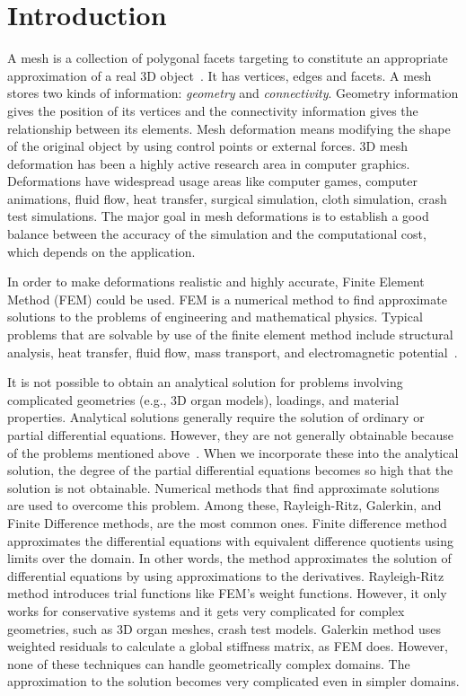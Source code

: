 \chapter{Introduction}
\label{chapter1}

A mesh is a collection of polygonal facets targeting to constitute an appropriate approximation of a real 3D object~\cite{Wang07}. It has vertices, edges and facets. A mesh stores two kinds of information: \textit{geometry} and \textit{connectivity}. Geometry information gives the position of its vertices and the connectivity information gives the relationship between its elements. Mesh deformation means modifying the shape of the original object by using control points or external forces. 3D mesh deformation has been a highly active research area in computer graphics. Deformations have widespread usage areas like computer games, computer animations, fluid flow, heat transfer, surgical simulation, cloth simulation, crash test simulations. The major goal in mesh deformations is to establish a good balance between the accuracy of the simulation and the computational cost, which depends on the application.

In order to make deformations realistic and highly accurate, Finite Element Method (FEM) could be used. FEM is a numerical method to find approximate solutions to the problems of engineering and mathematical physics. Typical problems that are solvable by use of the finite element method include structural analysis, heat transfer, fluid flow, mass transport, and electromagnetic potential~\cite{Logan07}.

It is not possible to obtain an analytical solution for problems involving complicated geometries (e.g., 3D organ models), loadings, and material properties. Analytical solutions generally require the solution of ordinary or partial differential equations. However, they are not generally obtainable because of the problems mentioned above~\cite{Logan07}. When we incorporate these into the analytical solution, the degree of the partial differential equations becomes so high that the solution is not obtainable. Numerical methods that find approximate solutions are used to overcome this problem. Among these, Rayleigh-Ritz, Galerkin, and Finite Difference methods, are the most common ones. Finite difference method approximates the differential equations with equivalent difference quotients using limits over the domain. In other words, the method approximates the solution of differential equations by using approximations to the derivatives. Rayleigh-Ritz method introduces trial functions like FEM's weight functions. However, it only works for conservative systems and it gets very complicated for complex geometries, such as 3D organ meshes, crash test models. Galerkin method uses weighted residuals to calculate a global stiffness matrix, as FEM does. However, none of these techniques can handle geometrically complex domains. The approximation to the solution becomes very complicated even in simpler domains.

